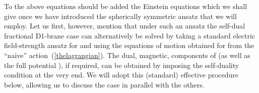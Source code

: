 \documentclass[a4paper,11pt]{article}
\providecommand{\eqref}[1]{(\ref{#1})}
\begin{document}
To the above equations should be added the Einstein equations which we
shall give once we have introduced the spherically symmetric ansatz
that we will employ. Let us first, however, mention that under such an
ansatz the self-dual fractional D1-brane case can alternatively be
solved by taking a standard electric field-strength ansatz for
\coordHE{} and using the equations of motion obtained for
\coordHE{} from the ``naive'' action~\eqref{thelagrangian}. The dual,
magnetic, components of \coordHE{} (as well as the full
potential \coordHE{}), if required, can be obtained by imposing the
self-duality condition at the very end. We will adopt this (standard)
effective procedure below, allowing us to discuss the case \coordHE{} in
parallel with the others.



\end{document}
